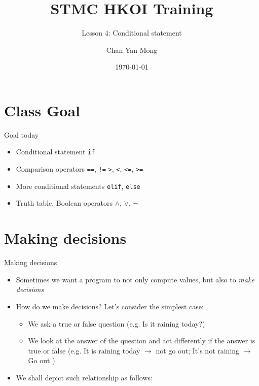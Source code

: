 \documentclass[10pt,xcolor={table,dvipsnames},t]{beamer}
\title[Your Short Title]{STMC HKOI Training}
\subtitle{Lesson 4: Conditional statement}
\author{Chan Yan Mong}
\date{\today}
\begin{document}
\begin{frame}
  \titlepage
\end{frame}


\section{Class Goal}

\begin{frame}{Goal today}

\begin{itemize}
  \item Conditional statement \texttt{if}
  \item Comparison operators \texttt{==}, \texttt{!=} \texttt{>}, \texttt{<}, \texttt{<=}, \texttt{>=}
  \item More conditional statements \texttt{elif}, \texttt{else}
  \item Truth table, Boolean operators $\land$, $\lor$, $\neg$
\end{itemize}

\end{frame}


\section{Making decisions}
\begin{frame}{Making decisions}
    \begin{itemize}
      \item Sometimes we want a program to not only compute values, but also to \textit{make decisions}
      \vspace{2mm}
      \item How do we make decisions? Let's consider the simplest case:
      \begin{itemize}
        \item We ask a true or false question (e.g. Is it raining today?)
        \item We look at the answer of the question and act differently if the answer is true or false (e.g. It is raining today $\rightarrow$ not go out; It's not raining  $\rightarrow$ Go out )
      \end{itemize}
      \item We shall depict such relationship as follows:
    \end{itemize}
\end{frame}
\end{document}
